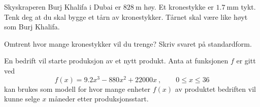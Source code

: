 %



\Oppgave[1] 

Skyskraperen Burj Khalifa i Dubai er $\SI{828}{\m}$ høy. Et kronestykke er
$\SI{1.7}{\mm}$ tykt. Tenk deg at du skal bygge et tårn av kronestykker. Tårnet
skal være like høyt som Burj Khalifa. \bigskip

Omtrent hvor mange kronestykker vil du trenge? Skriv svaret på standardform.


\Oppgave[7]

En bedrift vil starte produksjon av et nytt produkt. Anta at funksjonen $f$ er
gitt ved
%
\begin{equation*}
  f(x)
  = \num{9.2} x^3 - 880x^2 + \num{22000} x \ ,
  \qquad 0 \leq x \leq 36
\end{equation*}
%
kan brukes som modell for hvor mange enheter $f(x)$ av produktet bedriften vil
kunne selge $x$ måneder etter produksjonsstart.

